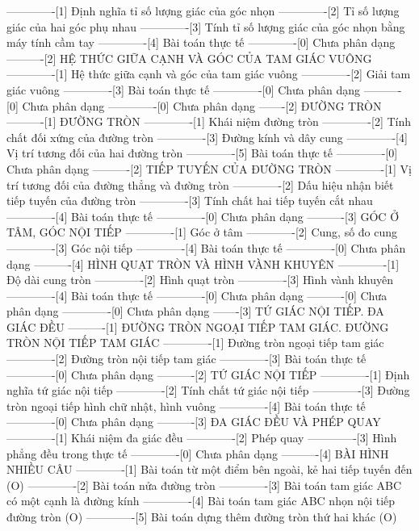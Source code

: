 -------------[1] Định nghĩa tỉ số lượng giác của góc nhọn
-------------[2] Tỉ số lượng giác của hai góc phụ nhau
-------------[3] Tính tỉ số lượng giác của góc nhọn bằng máy tính cầm tay
-------------[4] Bài toán thực tế
-------------[0] Chưa phân dạng
----------[2] HỆ THỨC GIỮA CẠNH VÀ GÓC CỦA TAM GIÁC VUÔNG
-------------[1] Hệ thức giữa cạnh và góc của tam giác vuông
-------------[2] Giải tam giác vuông
-------------[3] Bài toán thực tế
-------------[0] Chưa phân dạng
----------[0] Chưa phân dạng
-------------[0] Chưa phân dạng
-------[2] ĐƯỜNG TRÒN
----------[1] ĐƯỜNG TRÒN
-------------[1] Khái niệm đường tròn
-------------[2] Tính chất đối xứng của đường tròn
-------------[3] Đường kính và dây cung
-------------[4] Vị trí tương đối của hai đường tròn
-------------[5] Bài toán thực tế
-------------[0] Chưa phân dạng
----------[2] TIẾP TUYẾN CỦA ĐƯỜNG TRÒN
-------------[1] Vị trí tương đối của đường thẳng và đường tròn
-------------[2] Dấu hiệu nhận biết tiếp tuyến của đường tròn
-------------[3] Tính chất hai tiếp tuyến cắt nhau
-------------[4] Bài toán thực tế
-------------[0] Chưa phân dạng
----------[3] GÓC Ở TÂM, GÓC NỘI TIẾP
-------------[1] Góc ở tâm
-------------[2] Cung, số đo cung
-------------[3] Góc nội tiếp
-------------[4] Bài toán thực tế
-------------[0] Chưa phân dạng
----------[4] HÌNH QUẠT TRÒN VÀ HÌNH VÀNH KHUYÊN
-------------[1] Độ dài cung tròn
-------------[2] Hình quạt tròn
-------------[3] Hình vành khuyên
-------------[4] Bài toán thực tế
-------------[0] Chưa phân dạng
----------[0] Chưa phân dạng
-------------[0] Chưa phân dạng
-------[3] TỨ GIÁC NỘI TIẾP. ĐA GIÁC ĐỀU
----------[1] ĐƯỜNG TRÒN NGOẠI TIẾP TAM GIÁC. ĐƯỜNG TRÒN NỘI TIẾP TAM GIÁC
-------------[1] Đường tròn ngoại tiếp tam giác
-------------[2] Đường tròn nội tiếp tam giác
-------------[3] Bài toán thực tế
-------------[0] Chưa phân dạng
----------[2] TỨ GIÁC NỘI TIẾP
-------------[1] Định nghĩa tứ giác nội tiếp
-------------[2] Tính chất tứ giác nội tiếp
-------------[3] Đường tròn ngoại tiếp hình chữ nhật, hình vuông
-------------[4] Bài toán thực tế
-------------[0] Chưa phân dạng
----------[3] ĐA GIÁC ĐỀU VÀ PHÉP QUAY
-------------[1] Khái niệm đa giác đều
-------------[2] Phép quay
-------------[3] Hình phẳng đều trong thực tế
-------------[0] Chưa phân dạng
----------[4] BÀI HÌNH NHIỀU CÂU
-------------[1] Bài toán từ một điểm bên ngoài, kẻ hai tiếp tuyến đến (O)
-------------[2] Bài toán nửa đường tròn
-------------[3] Bài toán tam giác ABC có một cạnh là đường kính
-------------[4] Bài toán tam giác ABC nhọn nội tiếp đường tròn (O)
-------------[5] Bài toán dựng thêm đường tròn thứ hai khác (O)
